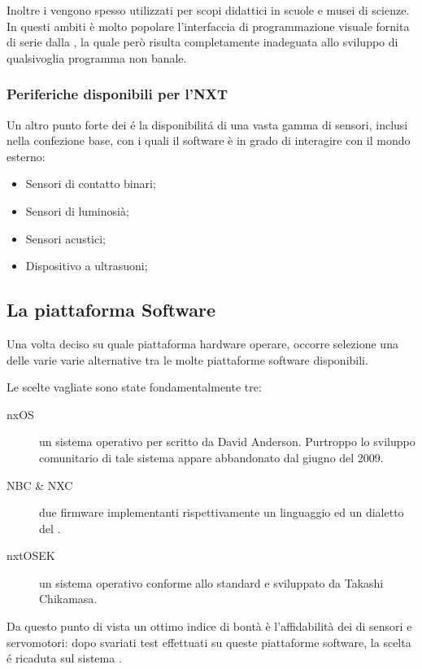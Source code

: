 Inoltre i \nxt{} vengono spesso utilizzati per scopi didattici in scuole 
e musei di scienze. In questi ambiti \`e molto popolare l'interfaccia di
programmazione visuale fornita di serie dalla \lego, la quale per\`o
risulta completamente inadeguata allo sviluppo di qualsivoglia programma
non banale.

\subsubsection{Periferiche disponibili per l'NXT}

Un altro punto forte dei \nxt{} \'e la disponibilit\'a di una vasta gamma
di sensori, inclusi nella confezione base, con i quali il software \`e in
grado di interagire con il mondo esterno:

\begin{itemize}
\item   Sensori di contatto binari;
\item   Sensori di luminosi\`a;
\item   Sensori acustici;
\item   Dispositivo  a ultrasuoni;
\end{itemize}

\subsection{La piattaforma Software}

Una volta deciso su quale piattaforma hardware operare, occorre selezione
una delle varie varie alternative tra le molte piattaforme software
disponibili.

Le scelte vagliate sono state fondamentalmente tre:
\begin{description}
    \item[nxOS]\cite{bib:nxos} un sistema operativo per \nxt{} scritto da
    David Anderson. Purtroppo lo sviluppo comunitario di tale sistema
    appare abbandonato dal giugno del 2009.
    \item[NBC \& NXC]\cite{bib:nbcnxc} due firmware implementanti
    rispettivamente un linguaggio  ed un dialetto
    del .
    \item[nxtOSEK] un sistema operativo conforme allo standard
     \cite{bib:osek} e sviluppato da Takashi Chikamasa.
\end{description}

Da questo punto di vista un ottimo indice di bont\`a \`e l'affidabilit\`a
dei  di sensori e servomotori: dopo svariati
test effettuati su queste piattaforme software, la scelta \'e ricaduta sul
sistema .

